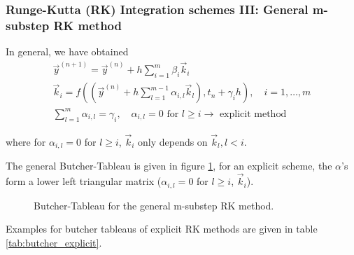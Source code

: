 \subsubsection{Runge-Kutta (RK) Integration schemes III: General m-substep RK method}
In general, we have obtained
\begin{equation}
  \begin{gathered}
  \vec{y}^{(n+1)}=\vec{y}^{(n)}+h \sum_{i=1}^m \beta_i \vec{k}_i \\
  \vec{k}_i=f\left(\left(\vec{y}^{(n)}+h \sum_{l=1}^{m-1} \alpha_{i, l} \vec{k}_l\right), t_n+\gamma_i h\right), \quad i=1, \ldots, m \\
  \sum_{l=1}^m \alpha_{i, l}=\gamma_i, \quad \alpha_{i, l}=0 \text { for } l \geq i \rightarrow \text { explicit method }
  \end{gathered}
\end{equation}

where for $\alpha_{i,l} = 0$ for $l\geq i$, $\vec{k}_i$ only depends on $\vec{k}_l,l<i$.

The general Butcher-Tableau is given in figure \ref{fig:butcher}, for an explicit scheme, the $\alpha$'s form a lower
left triangular matrix ($\alpha_{i,l} = 0$ for $l\geq i$, $\vec{k}_i$).

\begin{figure}[!htb]
  \centering
  \hfill
  \caption{Butcher-Tableau for the general m-substep RK method.}
  \label{fig:butcher}
\end{figure}

Examples for butcher tableaus of explicit RK methods are given in table \ref{tab:butcher_explicit}.

